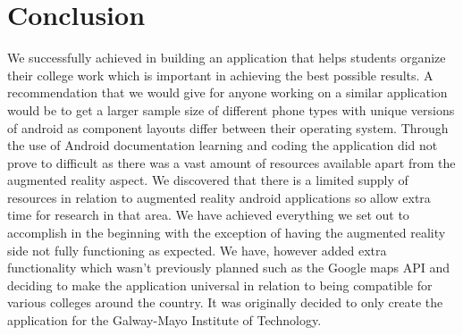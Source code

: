 \chapter{Conclusion}
We successfully achieved in building an application that helps students organize their college work which is important in achieving the best possible results. A recommendation that we would give for anyone working on a similar application would be to get a larger sample size of different phone types with unique versions of android as component layouts differ between their operating system. Through the use of Android documentation learning and coding the application did not prove to difficult as there was a vast amount of resources available apart from the augmented reality aspect. We discovered that there is a limited supply of resources in relation to augmented reality android applications so allow extra time for research in that area. We have achieved everything we set out to accomplish in the beginning with the exception of having the augmented reality side not fully functioning as expected. We have, however added extra functionality which wasn’t previously planned such as the Google maps API and deciding to make the application universal in relation to being compatible for various colleges around the country. It was originally decided to only create the application for the Galway-Mayo Institute of Technology.



